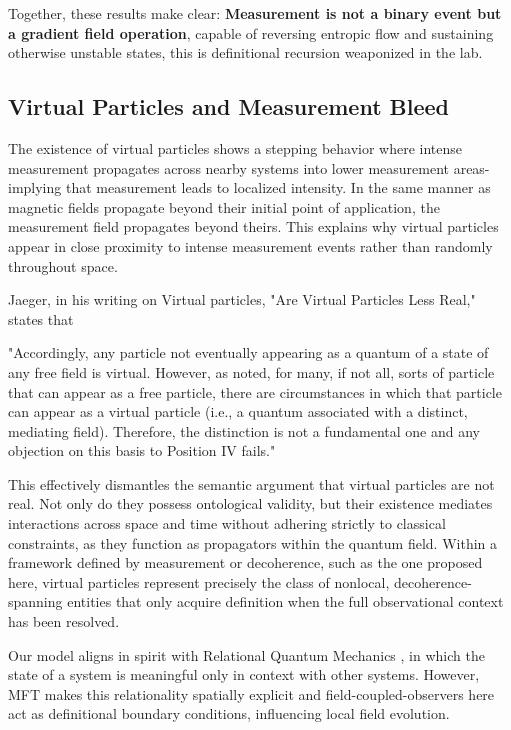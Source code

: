 Together, these results make clear: \textbf{Measurement is not a binary event but a gradient field operation}, capable of reversing entropic flow and sustaining otherwise unstable states, this is definitional recursion weaponized in the lab.

\subsection{Virtual Particles and Measurement Bleed}

The existence of virtual particles shows a stepping behavior where intense measurement propagates across nearby systems into lower measurement areas-implying that measurement leads to localized intensity. In the same manner as magnetic fields propagate beyond their initial point of application, the measurement field propagates beyond theirs. This explains why virtual particles appear in close proximity to intense measurement events rather than randomly throughout space.

Jaeger, in his writing on Virtual particles, "Are Virtual Particles Less Real," states that 

"Accordingly, any particle not eventually appearing as a quantum of a state of any free field is virtual. However, as noted, for many, if not all, sorts of particle that can appear as a free particle, there are circumstances in which that particle can appear as a virtual particle (i.e., a quantum associated with a distinct, mediating field). Therefore, the distinction is not a fundamental one and any objection on this basis to Position IV fails."\cite{jaeger_are_2019}

This effectively dismantles the semantic argument that virtual particles are not real. Not only do they possess ontological validity, but their existence mediates interactions across space and time without adhering strictly to classical constraints, as they function as propagators within the quantum field. Within a framework defined by measurement or decoherence, such as the one proposed here, virtual particles represent precisely the class of nonlocal, decoherence-spanning entities that only acquire definition when the full observational context has been resolved.

Our model aligns in spirit with Relational Quantum Mechanics \cite{rovelli_relational_1996}, in which the state of a system is meaningful only in context with other systems. However, MFT makes this relationality spatially explicit and field-coupled-observers here act as definitional boundary conditions, influencing local field evolution.

